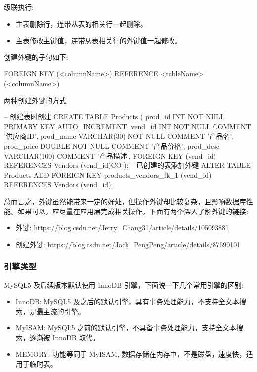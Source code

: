 级联执行:
\begin{itemize}
    \item 主表删除行，连带从表的相关行一起删除。
    \item 主表修改主键值，连带从表相关行的外键值一起修改。
\end{itemize}

创建外键的子句如下:
\begin{sql}
FOREIGN KEY (<columnName>) REFERENCE <tableName> (<columnName>)
\end{sql}

两种创建外键的方式

\begin{sql}
-- 创建表时创建
CREATE TABLE Products (
	prod_id     INT             NOT NULL PRIMARY KEY AUTO_INCREMENT,
	vend_id     INT             NOT NULL COMMENT '供应商ID',
	prod_name   VARCHAR(30)     NOT NULL COMMENT '产品名',
	prod_price  DOUBLE          NOT NULL COMMENT '产品价格',
	prod_desc   VARCHAR(100)    COMMENT '产品描述',
	FOREIGN KEY (vend_id) REFERENCES Vendors (vend_id)CO
);
-- 已创建的表添加外键
ALTER TABLE Products 
    ADD FOREIGN KEY products_vendors_fk_1 (vend_id) REFERENCES Vendors (vend_id);
\end{sql}


总而言之，外键虽然能带来一定的好处，但操作外键却比较复杂，且影响数据库性能。如果可以，应尽量在应用层完成相关操作。下面有两个深入了解外键的链接:

\begin{itemize}
    \item 外键: \url{https://blog.csdn.net/Jerry_Chang31/article/details/105093881}
    \item 创建外键: \url{https://blog.csdn.net/Jack_PengPeng/article/details/87690101}
\end{itemize}

\subsubsection{引擎类型}

MySQL5 及后续版本默认使用 InnoDB 引擎，下面说一下几个常用引擎的区别:

\begin{itemize}
    \item InnoDB: MySQL5 及之后的默认引擎，具有事务处理能力，不支持全文本搜索，是最主流的引擎。
    \item MyISAM: MySQL5 之前的默认引擎，不具备事务处理能力，支持全文本搜索，逐渐被 InnoDB 取代。
    \item MEMORY: 功能等同于 MyISAM, 数据存储在内存中，不是磁盘，速度快，适用于临时表。
\end{itemize}

